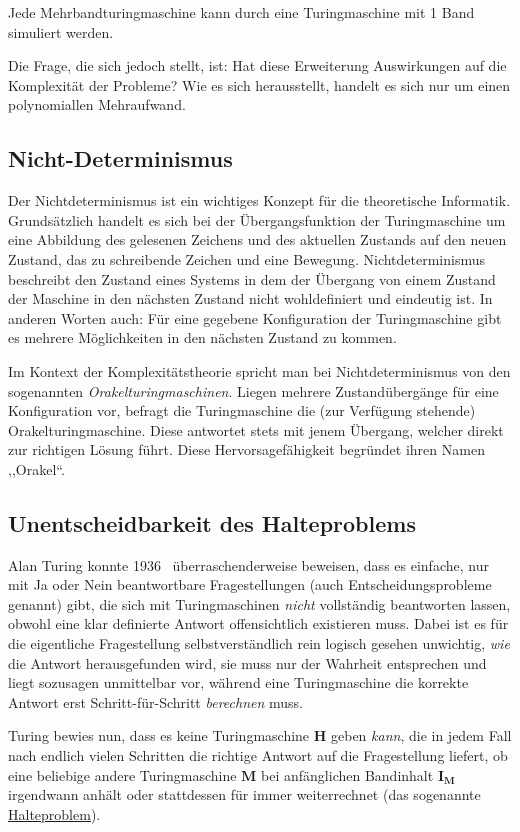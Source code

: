 Jede Mehrbandturingmaschine kann durch eine Turingmaschine mit 1 Band simuliert werden.

Die Frage, die sich jedoch stellt, ist: Hat diese Erweiterung Auswirkungen auf die Komplexität der Probleme? Wie es sich herausstellt, handelt es sich nur um einen polynomiallen Mehraufwand.
%
\subsection{Nicht-Determinismus}
\label{sec:nondeterminism}
%
Der Nichtdeterminismus ist ein wichtiges Konzept für die theoretische Informatik. Grundsätzlich handelt es sich bei der Übergangsfunktion der Turingmaschine um eine Abbildung des gelesenen Zeichens und des aktuellen Zustands auf den neuen Zustand, das zu schreibende Zeichen und eine Bewegung. Nichtdeterminismus beschreibt den Zustand eines Systems in dem der Übergang von einem Zustand der Maschine in den nächsten Zustand nicht wohldefiniert und eindeutig ist. In anderen Worten auch: Für eine gegebene Konfiguration der Turingmaschine gibt es mehrere Möglichkeiten in den nächsten Zustand zu kommen.

Im Kontext der Komplexitätstheorie spricht man bei Nichtdeterminismus von den sogenannten \emph{Orakelturingmaschinen}. Liegen mehrere Zustandübergänge für eine Konfiguration vor, befragt die Turingmaschine die (zur Verfügung stehende) Orakelturingmaschine. Diese antwortet stets mit jenem Übergang, welcher direkt zur richtigen Lösung führt. Diese Hervorsagefähigkeit begründet ihren Namen ,,Orakel``.
%
\subsection{Unentscheidbarkeit des Halteproblems}
%
Alan Turing konnte 1936~\cite{Turing01011937} überraschenderweise beweisen, dass es einfache, nur mit Ja oder Nein beantwortbare Fragestellungen (auch Entscheidungsprobleme genannt) gibt, die sich mit Turingmaschinen \emph{nicht} vollständig beantworten lassen, obwohl eine klar definierte Antwort offensichtlich existieren muss. Dabei ist es für die eigentliche Fragestellung selbstverständlich rein logisch gesehen unwichtig, \emph{wie} die Antwort herausgefunden wird, sie muss nur der Wahrheit entsprechen und liegt sozusagen unmittelbar vor, während eine Turingmaschine die korrekte Antwort erst Schritt-für-Schritt \emph{berechnen} muss.

Turing bewies nun, dass es keine Turingmaschine $\mathbf{H}$ geben \emph{kann}, die in jedem Fall nach endlich vielen Schritten die richtige Antwort auf die Fragestellung liefert, ob eine beliebige andere Turingmaschine $\mathbf{M}$ bei anfänglichen Bandinhalt $\mathbf{I_M}$ irgendwann anhält oder stattdessen für immer weiterrechnet (das sogenannte \href{http://de.wikipedia.org/wiki/Halteproblem}{Halteproblem}).

